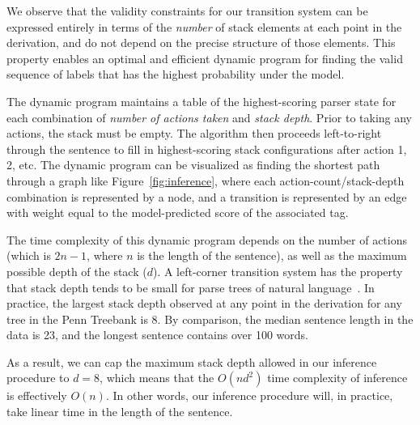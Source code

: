 \documentclass[11pt,a4paper]{article}
\begin{document}
We observe that the validity constraints for our transition system can be expressed entirely in terms of the \emph{number} of stack elements at each point in the derivation, and do not depend on the precise structure of those elements. This property enables an optimal and efficient dynamic program for finding the valid sequence of labels that has the highest probability under the model.


The dynamic program maintains a table of the highest-scoring parser state for each combination of \emph{number of actions taken} and \emph{stack depth}. Prior to taking any actions, the stack must be empty. The algorithm then proceeds left-to-right through the sentence to fill in highest-scoring stack configurations after action 1, 2, etc. The dynamic program can be visualized as finding the shortest path through a graph like Figure~\ref{fig:inference}, where each action-count/stack-depth combination is represented by a node, and a transition is represented by an edge with weight equal to the model-predicted score of the associated tag.

The time complexity of this dynamic program depends on the number of actions (which is $2n-1$, where $n$ is the length of the sentence), as well as the maximum possible depth of the stack ($d$). A left-corner transition system has the property that stack depth tends to be small for parse trees of natural language~\citep{abney-johnson-1991-memory,schuler-etal-2010-broad}. In practice, the largest stack depth observed at any point in the derivation for any tree in the Penn Treebank is 8. By comparison, the median sentence length in the data is 23, and the longest sentence contains over 100 words.

As a result, we can cap the maximum stack depth allowed in our inference procedure to $d = 8$, which means that the $O(nd^2)$ time complexity of inference is effectively $O(n)$. In other words, our inference procedure will, in practice, take linear time in the length of the sentence.




\newcommand{\newstacka}[0]{\small
\begin{tikzpicture}[x=0.05\linewidth, y=0.05\linewidth][\draw[] (1.5, 1.5) node[shape=circle,thick,inner sep=0pt,blue] (N1) {\tt \$};

\draw[] (0.3, 0.5) node[shape=rectangle,blue,draw,thick,inner sep=2pt] (NA) {A};

\draw[thick,blue] (NA) -- (N1);
\end{tikzpicture}}
\end{document}
